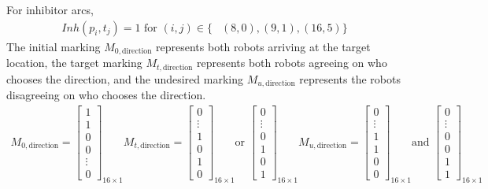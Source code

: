 \documentclass[12pt,a4paper]{article}
\begin{document}
For inhibitor arcs,
\begin{align*}
  Inh(p_i, t_j) = 1 \text{ for } (i, j) \in 
\{&(8, 0), (9, 1), (16, 5)\}
\end{align*}
The initial marking $M_{0, \text{direction}}$ represents both robots arriving at the target location, the target marking $M_{t, \text{direction}}$ represents both robots agreeing on who chooses the direction, and the undesired marking $M_{u, \text{direction}}$ represents the robots disagreeing on who chooses the direction.
\begin{align*}
    M_{0, \text{direction}} = \begin{bmatrix}
        1 \\ 1 \\ 0 \\ 0 \\ \vdots \\ 0
    \end{bmatrix}_{16 \times 1}
    M_{t, \text{direction}} = \begin{bmatrix}
        0 \\ \vdots \\ 1 \\ 0 \\ 1 \\ 0
    \end{bmatrix}_{16 \times 1} \text{or } 
    \begin{bmatrix}
        0 \\ \vdots \\ 0 \\ 1 \\ 0 \\ 1
    \end{bmatrix}_{16 \times 1}
    M_{u, \text{direction}} = \begin{bmatrix}
        0 \\ \vdots \\ 1 \\ 1 \\ 0 \\ 0
    \end{bmatrix}_{16 \times 1} \text{and } 
    \begin{bmatrix}
        0 \\ \vdots \\ 0 \\ 0 \\ 1 \\ 1
    \end{bmatrix}_{16 \times 1}
\end{align*}
\end{document}
